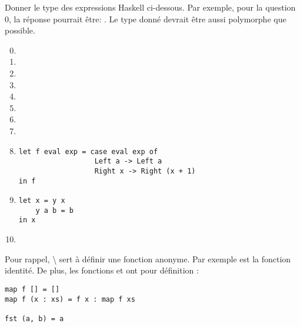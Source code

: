 \begin{Exercise}
  \label{ex:inference2}
Donner le type des expressions Haskell ci-dessous. Par exemple, pour
la question 0, la réponse pourrait être: . Le
type donné devrait être aussi polymorphe que possible.

\begin{enumerate}
\setcounter{enumi}{-1}
\item {}
\item {}
\item \codeinline{['a','b'] ++ ['c','d']}
\item {}
\item {}
\item {}
\item {}
\item \codeinline{[(1, 2), (3, 4)]}
\item 
\begin{verbatim}
let f eval exp = case eval exp of
                  Left a -> Left a
                  Right x -> Right (x + 1)
in f
\end{verbatim}
\item 
\begin{verbatim}
let x = y x
    y a b = b 
in x
\end{verbatim}
\item {}
\end{enumerate}

Pour rappel, {\textbackslash } sert à définir une fonction anonyme. Par
  exemple  est la fonction identité. De plus, les
  fonctions  et  ont pour définition :
\begin{verbatim}
map f [] = []               
map f (x : xs) = f x : map f xs

fst (a, b) = a
\end{verbatim}
\end{Exercise}

